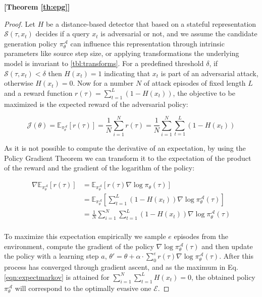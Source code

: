 \textbf{[Theorem \ref{th:epg}]}
\begin{proof}

Let $H$ be a distance-based detector that based on a stateful representation $\mathcal{S}(\tau, x_t)$ decides if a query $x_t$ is adversarial or not, and we assume the candidate generation policy $\pi_\theta^\mathcal{A}$ can influence this representation through intrinsic parameters like source step size, or applying transformations the underlying model is invariant to \eqref{tbl:transforms}.
For a predefined threshold $\delta$, if $\mathcal{S}(\tau, x_t) < \delta$ then $H(x_t) = 1$ indicating that $x_t$ is part of an adversarial attack, otherwise $H(x_t) = 0$.
Now for a number $N$ of attack episodes of fixed length $L$ and a reward function $r(\tau) = \sum_{t=1}^{L}(1 - H(x_t))$, the objective to be maximized is the expected reward of the adversarial policy:

\begin{equation}
    \mathcal{J}(\theta) = \mathbb{E}_{\pi_\theta^\mathcal{A}}[r(\tau)] = \frac{1}{N}\sum_{i=1}^{N}r(\tau) = \frac{1}{N}\sum_{i=1}^{N}\sum_{t=1}^{L}(1 - H(x_t))
\label{eqn:expectmarkov}
\end{equation}

As it is not possible to compute the derivative of an expectation, by using the Policy Gradient Theorem \cite{sutton1999policy} we can transform it to the expectation of the product of the reward and the gradient of the logarithm of the policy:

\begin{equation}
\begin{aligned}
    \nabla \mathbb{E}_{\pi_\theta^{\mathcal{A}}} [r(\tau)] &= \mathbb{E}_{\pi_\theta^{\mathcal{A}}}[r(\tau)\nabla \log \pi_\theta(\tau)]\\
    &= \mathbb{E}_{\pi_\theta^{\mathcal{A}}}[\sum_{t=1}^{L}(1 - H(x_t)) \nabla \log \pi_\theta^{\mathcal{A}}(\tau)]\\
    &= \frac{1}{N}\sum_{i=1}^{N}\sum_{t=1}^{L}(1 - H(x_t)) \nabla \log \pi_\theta^{\mathcal{A}}(\tau)\\
\label{eqn:rew_app}
\end{aligned}
\end{equation}

To maximize this expectation empirically we sample $e$ episodes from the environment, compute the gradient of the policy $\nabla\log\pi_{\theta}^{\mathcal{A}}(\tau)$ and then update the policy with a learning step $a$, $\theta' = \theta + \alpha\cdot\sum_{0}^{e}r(\tau)\nabla\log\pi_{\theta}^{\mathcal{A}}(\tau)$.
After this process has converged through gradient ascent, and as the maximum in Eq. \ref{eqn:expectmarkov} is attained for $\sum_{i=1}^{N}\sum_{t=1}^{L}H(x_t) = 0$, the obtained policy $\pi_\theta^\mathcal{A}$ will correspond to the optimally evasive one $\mathcal{E}$.
\end{proof}


